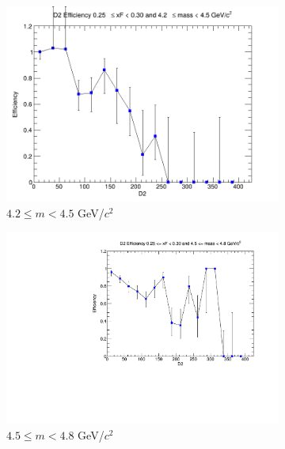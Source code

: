 \begin{figure}[p]
    \centering
    \begin{subfigure}[b]{0.32\textwidth}
        \centering
        \includegraphics[width=\textwidth]{./kTrackerEfficiencyPlots/D2_Efficiency_xF5_mass0.png}
        \caption{$4.2 \leq m < 4.5$ GeV/$c^2$}
        \label{fig:xF5_mass0}
    \end{subfigure}
    \hfill
    \begin{subfigure}[b]{0.32\textwidth}
        \centering
        \includegraphics[width=\textwidth]{./kTrackerEfficiencyPlots/D2_Efficiency_xF5_mass1.pdf}
        \caption{$4.5 \leq m < 4.8$ GeV/$c^2$}
        \label{fig:xF5_mass1}
    \end{subfigure}
    \hfill
    \begin{subfigure}[b]{0.32\textwidth}

\end{subfigure}
\end{figure}
